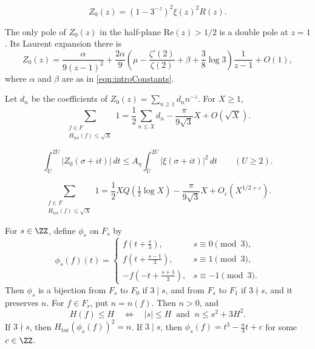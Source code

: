 \begin{equation}\label{eqn:Z0factorization} Z_0(z)=\left(1-3^{-z}\right)^2\xi(z)^2R(z). \end{equation}

\begin{proposition}\label{prop:leadingTerms} The only pole of $Z_0(z)$ in the half-plane $\mathrm{Re}(z)>1/2$ is a double pole at $z=1$. Its Laurent expansion there is \begin{equation}\label{eqn:Z0Laurent} Z_0(z)=\frac{\alpha}{9(z-1)^2} +\frac{2\alpha}{9}\left(\mu-\frac{\zeta'(2)}{\zeta(2)}+\beta +\frac38\log3\right)\frac{1}{z-1}+O(1), \end{equation} where $\alpha$ and $\beta$ are as in \eqref{eqn:introConstants}. \end{proposition}

\begin{lemma}\label{lemma:reducibles} Let $d_n$ be the coefficients of $Z_0(z)=\sum_{n\geq1}d_n n^{-z}$. For $X\geq1$, \begin{equation}\label{eqn:weightedPolynomialCount} \sum_{\substack{f\in F\\H_{\mathrm{tor}}(f)\leq\sqrt X}}1 =\frac12\sum_{n\leq X}d_n -\frac{\pi}{9\sqrt3}X+O(\sqrt X). \end{equation} \end{lemma}

\begin{equation}\label{eqn:heightMeanBound} \int_U^{2U}|Z_0(\sigma+it)|\,dt \leq A_\eta\int_U^{2U}|\xi(\sigma+it)|^2\,dt \qquad (U \geq 2). \end{equation}

\begin{equation}\label{eqn:irrPolys} \sum_{\substack{f\in F\\H_{\mathrm{tor}}(f)\leq\sqrt X}}1 =\frac12XQ\left(\tfrac12\log X\right) -\frac{\pi}{9\sqrt3}X +O_\varepsilon(X^{1/2+\varepsilon}). \end{equation}

\begin{lemma}\label{lemma:generalHeightReduction} For $s\in\ZZ$, define $\phi_s$ on $F_s$ by \[ \phi_s(f)(t)= \begin{cases} f(t+\tfrac{s}{3}),&s\equiv0\pmod3,\\ f(t+\tfrac{s-1}{3}),&s\equiv1\pmod3,\\ -f(-t+\tfrac{s+1}{3}),&s\equiv-1\pmod3. \end{cases} \] Then $\phi_s$ is a bijection from $F_s$ to $F_0$ if $3\mid s$, and from $F_s$ to $F_1$ if $3\nmid s$, and it preserves $n$. For $f\in F_s$, put $n=n(f)$. Then $n>0$, and \[ H(f)\leq H \quad\Longleftrightarrow\quad |s|\leq H\ \text{ and }\ n\leq s^2+3H^2. \] If $3\nmid s$, then $H_{\mathrm{tor}}(\phi_s(f))^2=n$. If $3\mid s$, then $\phi_s(f)=t^3-\frac n3t+c$ for some $c\in\ZZ$. \end{lemma}

